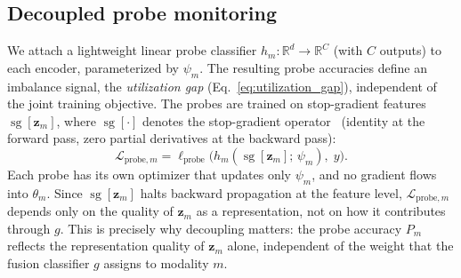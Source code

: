 \documentclass{article}
\newcommand{\loss}{\mathcal{L}}
\newcommand{\probe}{h}
\newcommand{\sg}{\operatorname{sg}}
\begin{document}
\FloatBarrier
\subsection{Decoupled probe monitoring}
\label{sec:probes}

We attach a lightweight linear probe classifier $\probe_m\colon \mathbb{R}^d \to \mathbb{R}^C$ (with $C$ outputs) to each encoder, parameterized by $\psi_m$. The resulting probe accuracies define an imbalance signal, the \emph{utilization gap} (Eq.~\eqref{eq:utilization_gap}), independent of the joint training objective. The probes are trained on stop-gradient features $\sg[\mathbf{z}_m]$, where $\sg[\cdot]$ denotes the stop-gradient operator~\citep{vandenoord2017vqvae} (identity at the forward pass, zero partial derivatives at the backward pass):
%
\begin{equation}
\label{eq:probe_loss}
\loss_{\text{probe},m} = \ell_{\text{probe}}\!\bigl(\probe_m(\sg[\mathbf{z}_m];\,\psi_m),\; y\bigr).
\end{equation}
%
Each probe has its own optimizer that updates only $\psi_m$, and no gradient flows into $\theta_m$. Since $\sg[\mathbf{z}_m]$ halts backward propagation at the feature level, $\loss_{\text{probe},m}$ depends only on the quality of $\mathbf{z}_m$ as a representation, not on how it contributes through $g$. This is precisely why decoupling matters: the probe accuracy $P_m$ reflects the representation quality of $\mathbf{z}_m$ alone, independent of the weight that the fusion classifier $g$ assigns to modality $m$.
\end{document}

